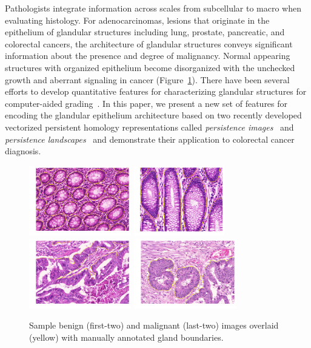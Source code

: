\documentclass{article}
\newcounter{lfigcounter}
\begin{document}
Pathologists integrate information across scales from subcellular to macro when evaluating histology. For adenocarcinomas, lesions that originate in the epithelium of glandular structures including lung, prostate, pancreatic, and colorectal cancers, the architecture of glandular structures conveys significant information about the presence and degree of malignancy. Normal appearing structures with organized epithelium become disorganized with the unchecked growth and aberrant signaling in cancer (Figure~\ref{fig:benign_malignant_example}). There have been several efforts to develop quantitative features for characterizing glandular structures for computer-aided grading~\cite{Doyle2007, Doyle2008,Altunbay2010,Singh2014}. In this paper, we present a new set of features for encoding the glandular epithelium architecture based on two recently developed vectorized persistent homology representations called \emph{persistence images}~\cite{Adams2015} and \emph{persistence landscapes}~\cite{Bubenik2012} and demonstrate their application to colorectal cancer diagnosis.

%
\begin{figure}[t]
\centering
\setcounter{lfigcounter}{1}
\includegraphics[height=1.2in]{figures/train_22_gland_annot.png}
\includegraphics[height=1.2in]{figures/train_84_gland_annot.png}
\includegraphics[height=1.2in]{figures/train_11_gland_annot.png}
\includegraphics[height=1.2in]{figures/train_81_gland_annot.png}
\caption{Sample benign (first-two) and malignant (last-two) images overlaid (yellow) with manually annotated gland boundaries.}
\label{fig:benign_malignant_example}
\end{figure}
%
\vspace{-0.5cm}
\end{document}
